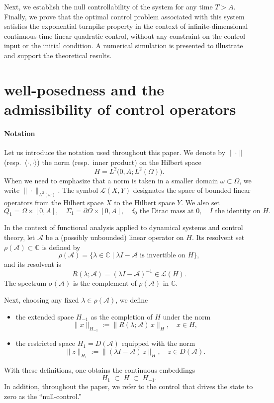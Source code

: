 \documentclass[10pt, a4]{amsart}
\theoremstyle{plain}
\theoremstyle{definition}
\theoremstyle{remark}
\numberwithin{equation}{section}
\begin{document}
Next, we establish the null controllability of the system for any time \( T > A \). Finally, we prove that the optimal control problem associated with this system satisfies the exponential turnpike property in the context of infinite-dimensional continuous-time linear-quadratic control, without any constraint on the control input or the initial condition. A numerical simulation is presented to illustrate and support the theoretical results.
\section{well-posedness and the admissibility of control operators}\label{s2}
\paragraph{\bf Notation}
Let us introduce the notation used throughout this paper. We denote by \(\|\cdot\|\) (resp.\ \(\langle\cdot,\cdot\rangle\)) the norm (resp.\ inner product) on the Hilbert space 
\[
H = L^2\bigl(0,A;L^2(\Omega)\bigr).
\]
When we need to emphasize that a norm is taken in a smaller domain \(\omega\subset\Omega\), we write \(\|\cdot\|_{L^2(\omega)}\). The symbol \(\mathcal{L}(X,Y)\) designates the space of bounded linear operators from the Hilbert space \(X\) to the Hilbert space \(Y\). We also set
\[
Q_1 = \Omega\times[0,A],\quad
\Sigma_1 = \partial\Omega\times[0,A],\quad
\delta_0\text{ the Dirac mass at }0,\quad
I\text{ the identity on }H.
\]

In the context of functional analysis applied to dynamical systems and control theory, let \(\mathcal A\) be a (possibly unbounded) linear operator on \(H\). Its resolvent set \(\rho(\mathcal A)\subset\mathbb C\) is defined by
\[
\rho(\mathcal A)
=\bigl\{\lambda\in\mathbb C\mid\lambda I-\mathcal A
\text{ is invertible on }H\bigr\},
\]
and its resolvent is 
\[
R(\lambda;\mathcal A)=(\lambda I-\mathcal A)^{-1}\in\mathcal L(H).
\]
The spectrum \(\sigma(\mathcal A)\) is the complement of \(\rho(\mathcal A)\) in \(\mathbb C\).

Next, choosing any fixed \(\lambda\in\rho(\mathcal A)\), we define
\begin{itemize}
    \item the extended space \(H_{-1}\) as the completion of \(H\) under the norm
  \[
  \|x\|_{H_{-1}}:=\bigl\|R(\lambda;\mathcal A)\,x\bigr\|_{H},
  \quad x\in H,
  \]
\item  the restricted space \(H_{1}=D(\mathcal A)\) equipped with the norm
  \[
  \|z\|_{H_{1}}:=\bigl\|(\lambda I-\mathcal A)\,z\bigr\|_{H},
  \quad z\in D(\mathcal A).
  \]
\end{itemize}
With these definitions, one obtains the continuous embeddings
\[
H_1\;\subset\;H\;\subset\;H_{-1}.
\]
In addition, throughout the paper, we refer to the control that drives the state to zero as the “null-control.”
\end{document}
